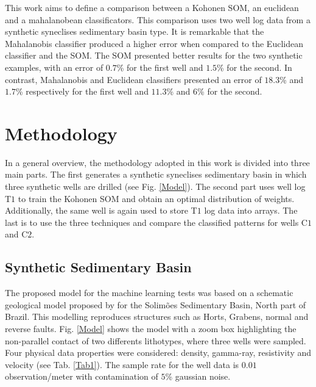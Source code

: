 \documentclass{cph18}
\begin{document}

This work aims to define a comparison between a Kohonen SOM, an euclidean and a mahalanobean classificators. This comparison uses two well log data from a synthetic syneclises sedimentary basin type. It is remarkable that  the Mahalanobis classifier produced a higher error when compared to the Euclidean classifier and the SOM. The SOM presented better results for the two synthetic examples, with an error of $0.7$\% for the first well and $1.5$\% for the second. In contrast, Mahalanobis and Euclidean classifiers presented an error of $18.3$\% and $1.7$\% respectively for the first well and $11.3$\% and $6$\% for the second. 



\section{Methodology}
\label{Metodo}

In a general overview, the methodology adopted in this work is divided into three main parts. The first generates a synthetic syneclises sedimentary basin in which three synthetic wells are drilled (see Fig. \ref{Model}). The second part uses well log T$1$ to train the Kohonen SOM and obtain an optimal distribution of weights. Additionally, the same well is again used to store T$1$ log data into arrays. The last is to use the three techniques and compare the classified patterns for wells C$1$ and C$2$.

\subsection{Synthetic Sedimentary Basin}

The proposed model for the machine learning tests was based on a schematic geological model proposed by  \cite{Sal2008} for the Solim\~oes Sedimentary Basin, North part of Brazil. This modelling reproduces structures such as Horts, Grabens, normal and reverse faults. Fig. \ref{Model} shows the model with a zoom box highlighting the non-parallel contact of two differents lithotypes, where three wells were sampled. Four physical data properties were considered: density, gamma-ray, resistivity and velocity (see Tab. \ref{Tab1}). The sample rate for the well data is $0.01$ observation/meter with contamination of $5$\% gaussian noise.
\end{document}
